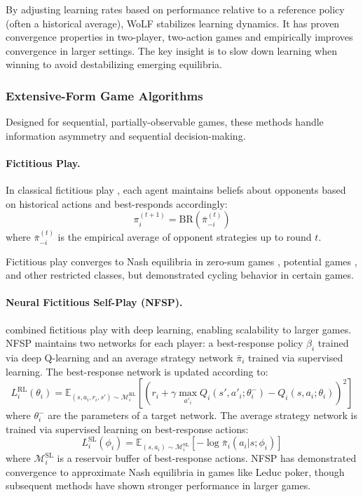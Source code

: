 By adjusting learning rates based on performance relative to a reference policy (often a historical average), WoLF stabilizes learning dynamics. It has proven convergence properties in two-player, two-action games and empirically improves convergence in larger settings. The key insight is to slow down learning when winning to avoid destabilizing emerging equilibria.

\subsubsection{Extensive-Form Game Algorithms}

Designed for sequential, partially-observable games, these methods handle information asymmetry and sequential decision-making.

\paragraph{Fictitious Play.} In classical fictitious play \citep{Brown1951}, each agent maintains beliefs about opponents based on historical actions and best-responds accordingly:
\begin{equation}
\pi_i^{(t+1)} = \textrm{BR}(\bar{\pi}_{-i}^{(t)})
\end{equation}
where $\bar{\pi}_{-i}^{(t)}$ is the empirical average of opponent strategies up to round $t$.

Fictitious play converges to Nash equilibria in zero-sum games \citep{Robinson1951}, potential games \citep{MondererShapley1996}, and other restricted classes, but \citet{Shapley1964} demonstrated cycling behavior in certain games.

\paragraph{Neural Fictitious Self-Play (NFSP).} \citet{HeinrichSilver2016} combined fictitious play with deep learning, enabling scalability to larger games. NFSP maintains two networks for each player: a best-response policy $\beta_i$ trained via deep Q-learning and an average strategy network $\bar{\pi}_i$ trained via supervised learning. The best-response network is updated according to:
\begin{equation}
L_i^{\text{RL}}(\theta_i) = \mathbb{E}_{(s,a_i,r_i,s') \sim \mathcal{M}_i^{\text{RL}}} [(r_i + \gamma \max_{a'_i} Q_i(s', a'_i; \theta_i^-) - Q_i(s, a_i; \theta_i))^2]
\end{equation}
where $\theta_i^-$ are the parameters of a target network. The average strategy network is trained via supervised learning on best-response actions:
\begin{equation}
L_i^{\text{SL}}(\phi_i) = \mathbb{E}_{(s,a_i) \sim \mathcal{M}_i^{\text{SL}}} [-\log \bar{\pi}_i(a_i|s; \phi_i)]
\end{equation}
where $\mathcal{M}_i^{\text{SL}}$ is a reservoir buffer of best-response actions. NFSP has demonstrated convergence to approximate Nash equilibria in games like Leduc poker, though subsequent methods have shown stronger performance in larger games.

